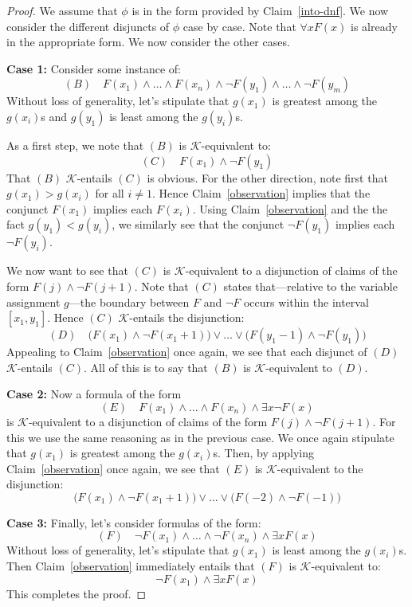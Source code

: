 \documentclass[12pt]{article}
\begin{document}
\begin{proof}
    We assume that $\phi$ is in the form provided by Claim~\ref{into-dnf}. 
    We now consider the different disjuncts of $\phi$ case by case. 
    Note that $\forall x F(x)$ is already in the appropriate form. 
    We now consider the other cases.
    
    \textbf{Case 1:} Consider some instance of:
    $$(B) \quad F(x_1)\wedge\dots\wedge F(x_n) \wedge \neg F(y_1) \wedge \dots \wedge \neg F(y_m)$$
    Without loss of generality, let's stipulate that $g(x_1)$ is greatest among the $g(x_i)$s and $g(y_1)$ is least among the $g(y_i)$s.
    
    As a first step, we note that $(B)$ is $\mathcal{K}$-equivalent to:
    $$(C) \quad F(x_1)\wedge \neg F(y_1)$$
    That $(B)$ $\mathcal{K}$-entails $(C)$ is obvious. 
    For the other direction, note first that $g(x_1)>g(x_i)$ for all $i\neq 1$. 
    Hence Claim~\ref{observation} implies that the conjunct $F(x_1)$ implies each $F(x_i)$. 
    Using Claim~\ref{observation} and the the fact $g(y_1)<g(y_i)$, we similarly see that the conjunct $\neg F(y_1)$ implies each $\neg F(y_i)$. 
    
    We now want to see that $(C)$ is $\mathcal{K}$-equivalent to a disjunction of claims of the form $F(j)\wedge\neg F(j+1)$. 
    Note that $(C)$ states that---relative to the variable assignment $g$---the boundary between $F$ and $\neg F$ occurs within the interval $[x_1,y_1]$. 
    Hence $(C)$ $\mathcal{K}$-entails the disjunction:
    $$(D) \quad \big(F(x_1)\wedge\neg F(x_1+1)\big)\vee \dots \vee \big(F(y_1-1)\wedge \neg F(y_1)\big)$$
    Appealing to Claim~\ref{observation} once again, we see that each disjunct of $(D)$ $\mathcal{K}$-entails $(C)$. 
    All of this is to say that $(B)$ is $\mathcal{K}$-equivalent to $(D)$.
    
    \textbf{Case 2:} Now a formula of the form 
    $$(E) \quad F(x_1)\wedge\dots\wedge F(x_n) \wedge \exists x \neg F(x)$$
    is $\mathcal{K}$-equivalent to a disjunction of claims of the form $F(j) \wedge \neg F(j+1)$. 
    For this we use the same reasoning as in the previous case. 
    We once again stipulate that $g(x_1)$ is greatest among the $g(x_i)$s. 
    Then, by applying Claim~\ref{observation} once again, we see that $(E)$ is $\mathcal{K}$-equivalent to the disjunction:
    $$\big(F(x_1)\wedge\neg F(x_1+1)\big)\vee \dots \vee \big(F(-2)\wedge \neg F(-1)\big)$$
    
    \textbf{Case 3:} Finally, let's consider formulas of the form:
    $$(F) \quad \neg F(x_1)\wedge\dots\wedge \neg F(x_n) \wedge \exists x F(x)$$
    Without loss of generality, let's stipulate that $g(x_1)$ is least among the $g(x_i)$s. 
    Then Claim~\ref{observation} immediately entails that $(F)$ is $\mathcal{K}$-equivalent to:
    $$\neg F(x_1)\wedge \exists x F(x)$$
    This completes the proof.
\end{proof}
\end{document}
